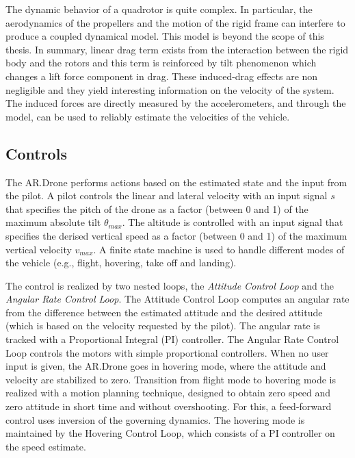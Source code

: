 The dynamic behavior of a quadrotor is quite complex.
In particular, the aerodynamics of the propellers and the motion of the rigid frame can interfere to produce a coupled dynamical model.
This model is beyond the scope of this thesis.
In summary, linear drag term exists from the interaction between the rigid body and the rotors and this term is reinforced by tilt phenomenon which changes a lift force component in drag.
These induced-drag effects are non negligible and they yield interesting information on the velocity of the system.
The induced forces are directly measured by the accelerometers, and through the model, can be used to reliably estimate the velocities of the vehicle.



\subsection{Controls}
The AR.Drone performs actions based on the estimated state and the input from the pilot.
A pilot controls the linear and lateral velocity with an input signal $s$ that specifies the pitch of the drone as a factor (between 0 and 1) of the maximum absolute tilt $\theta_{max}$.
The altitude is controlled with an input signal that specifies the derised vertical speed as a factor (between 0 and 1) of the maximum vertical velocity $v_{max}$.
A finite state machine is used to handle different modes of the vehicle (e.g., flight, hovering, take off and landing).

The control is realized by two nested loops, the \textit{Attitude Control Loop} and the \textit{Angular Rate Control Loop}.
The Attitude Control Loop computes an angular rate from the difference between the estimated attitude and the desired attitude (which is based on the velocity requested by the pilot).
The angular rate is tracked with a Proportional Integral (PI) controller.
The Angular Rate Control Loop controls the motors with simple proportional controllers.
When no user input is given, the AR.Drone goes in hovering mode, where the attitude and velocity are stabilized to zero.
Transition from flight mode to hovering mode is realized with a motion planning technique, designed to obtain zero speed and zero attitude in short time and without overshooting.
For this, a feed-forward control uses inversion of the governing dynamics.
The hovering mode is maintained by the Hovering Control Loop, which consists of a PI controller on the speed estimate.

